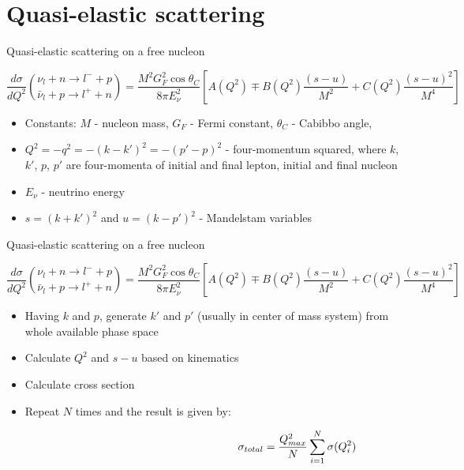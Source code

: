 \section{Quasi-elastic scattering}

\begin{wideslide}[toc=QEL on free N]{Quasi-elastic scattering on a free nucleon}
\null\vfill

  
  $$\frac{d\sigma}{dQ^2} {{\nu_l + n \rightarrow l^- + p}\choose{\bar\nu_l + p \rightarrow l^+ + n}} = \frac{M^2G_F^2\cos\theta_C}{8\pi E_\nu^2}\left[A(Q^2) \mp B(Q^2)\frac{(s - u)}{M^2} + C(Q^2)\frac{(s - u)^2}{M^4}\right]$$
  
  
  \begin{itemize}
    \item Constants: $M$ - nucleon mass, $G_F$ - Fermi constant, $\theta_C$ - Cabibbo angle,
    \item $Q^2 = -q^2 = - (k - k')^2 = - (p' - p)^2$ - four-momentum squared, where $k$, $k'$, $p$, $p'$ are four-momenta of initial and final lepton, initial and final nucleon
    \item $E_\nu$ - neutrino energy
    \item $s = (k + k')^2$ and $u = (k - p')^2$ - Mandelstam variables
  \end{itemize}

  
\vfill\null
\end{wideslide}

\begin{wideslide}[toc=]{Quasi-elastic scattering on a free nucleon}
\null\vfill

  
  $$\frac{d\sigma}{dQ^2} {{\nu_l + n \rightarrow l^- + p}\choose{\bar\nu_l + p \rightarrow l^+ + n}} = \frac{M^2G_F^2\cos\theta_C}{8\pi E_\nu^2}\left[A(Q^2) \mp B(Q^2)\frac{(s - u)}{M^2} + C(Q^2)\frac{(s - u)^2}{M^4}\right]$$
  
  
  \begin{itemize}
    \item Having $k$ and $p$, generate $k'$ and $p'$ (usually in center of mass system) from whole available phase space
    \item Calculate $Q^2$ and $s - u$ based on kinematics
    \item Calculate cross section
    \item Repeat $N$ times and the result is given by: 
    
    \vspace{-32pt}$$\hspace*{150pt}\sigma_{total} = \frac{Q^2_{max}}{N} \sum\limits_{i = 1}^N \sigma (Q_i^2)$$
    
  \end{itemize}

  
\vfill\null
\end{wideslide}
